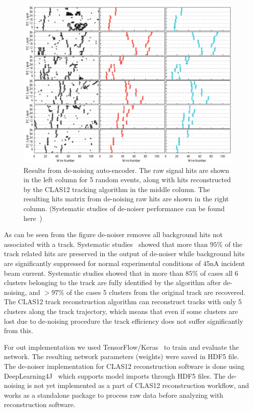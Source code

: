 \begin{figure}[!h]
\begin{center}
 \includegraphics[width=5.8in]{images/cnn_denoise_results.pdf}
\caption {Results from de-noising auto-encoder. The raw signal hits are shown
in the left column for 5 random events, along with hits reconstructed by the 
CLAS12 tracking algorithm in the middle column. The resulting  hits matrix 
from de-noising raw hits are shown in the right column. (Systematic studies 
of de-noiser performance can be found here~\cite{Thomadakis:2022zcd})}
 \label{network:cnn_results}
 \end{center}
\end{figure}

As can be seen from the figure de-noiser removes all background hits not associated 
with a track. Systematic studies~\cite{Thomadakis:2022zcd} showed that more than 
$95\%$ of the track related hits are preserved in the output of de-noiser while 
background hits are significantly suppressed for normal experimental conditions of 45nA
incident beam current. Systematic studies showed that in more than $85\%$ of cases all 
6 clusters belonging to the track are fully identified by the algorithm after de-noising, 
and $>97\%$ of the cases 5 clusters from the original track are recovered. The CLAS12 
track reconstruction algorithm can reconstruct tracks with only 5 clusters along the 
track trajectory, which means that even if some clusters are lost due to de-noising procedure 
the track efficiency does not suffer significantly from this.

For out implementation we used TensorFlow/Keras~\cite{keras-website} to train 
and evaluate the network. The resulting network parameters (weights) were saved 
in HDF5 file. The de-noiser implementation for CLAS12 reconstruction software is 
done using DeepLearning4J~\cite{dl4j-website} which supports model imports 
through HDF5 files. The de-noising is not yet implemented as a part of CLAS12 
reconstruction workflow, and works as a standalone package to process raw data 
before analyzing with reconstruction software.
